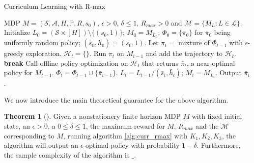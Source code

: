 \documentclass[12pt, letterpaper]{article}
\theoremstyle{definition}
\newtheorem*{thm}{Theorem}
\theoremstyle{remark}
\begin{document}
\begin{algorithm}[H]
    \caption{Curriculum Learning with R-max}
    \label{alg:curr_rmax}
\begin{algorithmic}[1]
    \Require MDP $M = (\mathcal{S}, \mathcal{A}, H, \mathbb{P}, R, s_0)$, $\epsilon > 0$, $\delta \leq 1$, $R_{max} > 0$ and $\mathcal{M} = \{M_L: L \in \mathcal{L}\}$.
    \State Initialize $L_0 = (\mathcal{S} \times [H]) \setminus \{(s_0, 1)\}$; $M_0 = M_{L_0}$; $\Phi_0 = \{\bar\pi_0\}$ for $\bar\pi_0$ being uniformly random policy; $(\bar s_0, \bar h_0) = (s_0, 1)$.
        \State Let $\pi_t =$ mixture of $\Phi_{t-1}$ with $\epsilon$-greedy exploration.
        \State $\mathcal{H}_t = \{\}$.
            \State Run $\pi_t$ on $M_{t-1}$ and add the trajectory to $\mathcal{H}_t$.
                \State \textbf{break}
            \EndIf
        \EndWhile
        \State Call offline policy optimization on $\mathcal{H}_t$ that returns $\bar \pi_{t}$, a near-optimal policy for $M_{t-1}$.
        \State $\Phi_t = \Phi_{t-1} \cup \{\bar \pi_{t-1}\}$.
        \State $L_t = L_{t-1} / (\bar s_t, \bar h_t)$; $M_t = M_{L_t}$.
    \EndFor
    \State Output $\bar \pi_t$.
\end{algorithmic}
\end{algorithm}



We now introduce the main theoretical guarantee for the above algorithm.

\begin{thm}[]
    Given a nonstationery finite horizon MDP \(M\) with fixed initial state, an \(\epsilon > 0\), a \(0 \leq \delta \leq 1\), the maximum reward for \(M\), \(R_{max}\) and the \(\mathcal{M}\) corresponding to \(M\), running algorithm \ref{alg:curr_rmax} with \(K_1, K_2, K_3\), the algorithm will output an \(\epsilon\)-optimal policy with probability \(1 - \delta\). Furthermore, the sample complexity of the algorithm is \(\_\).
\end{thm}
\end{document}
